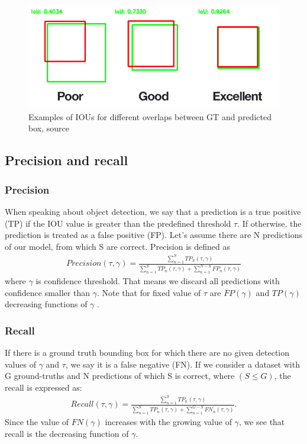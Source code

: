 \begin{figure}
    \includegraphics[width = \linewidth]{images/IOU.jpg}
    \caption{Examples of IOUs for different overlaps between GT and predicted box, source \cite{Cowton2019}}
    \label{fig:iou}
\end{figure}

\subsection{Precision and recall}
\subsubsection{Precision}
\label{subsec:precision}
When speaking about object detection, we say that a prediction is a true positive (TP) if the IOU value is greater than the predefined threshold $\tau$. If otherwise, the prediction is treated as a false positive (FP). Let's assume there are N predictions of our model, from which S are correct. Precision is defined as
\begin{align}
    Precision(\tau, \gamma) = \frac{\sum_{n=1}^S TP_n(\tau, \gamma)}{\sum_{n=1}^S TP_n(\tau, \gamma) + \sum_{n=1}^{N-S} FP_n(\tau, \gamma)}
\end{align}
where $\gamma$ is confidence threshold. That means we discard all predictions with confidence smaller than $\gamma$. Note that for fixed value of $\tau$ are $FP(\gamma)$ and $TP(\gamma)$ decreasing functions of $\gamma$ \cite{Padilla2021}.

\subsubsection{Recall}
\label{subsec:recall}
If there is a ground truth bounding box for which there are no given detection values of $\gamma$ and $\tau$, we say it is a false negative (FN). If we consider a dataset with G ground-truths and N predictions of which S is correct, where $(S \leq G)$, the recall is expressed as:
\begin{align}
    Recall(\tau, \gamma) = \frac{\sum_{n=1}^S TP_n(\tau, \gamma)}{\sum_{n=1}^S TP_n(\tau, \gamma) + \sum_{n=1}^{G-S} FN_n(\tau, \gamma)}.
\end{align}
Since the value of $FN(\gamma)$ increases with the growing value of $\gamma$, we see that recall is the decreasing function of $\gamma$.
